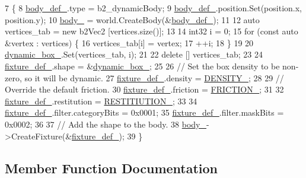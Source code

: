 \begin{DoxyCode}
7                                                                                           \{
8     \hyperlink{classCarBody_a304e0ab7625f9673e4f25c7c52cfd3f8}{body\_def\_}.type = b2\_dynamicBody;
9     \hyperlink{classCarBody_a304e0ab7625f9673e4f25c7c52cfd3f8}{body\_def\_}.position.Set(position.x, position.y);
10     \hyperlink{classCarBody_aa460930fa1548d1987051dfa6f68c897}{body\_} = world.CreateBody(&\hyperlink{classCarBody_a304e0ab7625f9673e4f25c7c52cfd3f8}{body\_def\_});
11 
12     \textcolor{keyword}{auto} vertices\_tab = \textcolor{keyword}{new} b2Vec2 [vertices.size()];
13 
14     int32 i = 0;
15     \textcolor{keywordflow}{for} (\textcolor{keyword}{const} \textcolor{keyword}{auto} &vertex : vertices) \{
16         vertices\_tab[i] = vertex;
17         ++i;
18     \}
19 
20     \hyperlink{classCarBody_aff94f91206a0bdfa00257e68bfcc5633}{dynamic\_box\_}.Set(vertices\_tab, i);
21 
22     \textcolor{keyword}{delete} [] vertices\_tab;
23 
24     \hyperlink{classCarBody_abd8188a5a14a45854cc80da8a70d1c12}{fixture\_def\_}.shape = &\hyperlink{classCarBody_aff94f91206a0bdfa00257e68bfcc5633}{dynamic\_box\_};
25 
26     \textcolor{comment}{// Set the box density to be non-zero, so it will be dynamic.}
27     \hyperlink{classCarBody_abd8188a5a14a45854cc80da8a70d1c12}{fixture\_def\_}.density = \hyperlink{classCarBody_a451074380bc9169117e9beb8303840fe}{DENSITY\_};
28 
29     \textcolor{comment}{// Override the default friction.}
30     \hyperlink{classCarBody_abd8188a5a14a45854cc80da8a70d1c12}{fixture\_def\_}.friction = \hyperlink{classCarBody_af87fcb5e61d186798ee126508eaf5f3f}{FRICTION\_};
31 
32     \hyperlink{classCarBody_abd8188a5a14a45854cc80da8a70d1c12}{fixture\_def\_}.restitution = \hyperlink{classCarBody_a726ff99793ed9dfc0f96e3690c3035f8}{RESTITIUTION\_};
33 
34     \hyperlink{classCarBody_abd8188a5a14a45854cc80da8a70d1c12}{fixture\_def\_}.filter.categoryBits = 0x0001;
35     \hyperlink{classCarBody_abd8188a5a14a45854cc80da8a70d1c12}{fixture\_def\_}.filter.maskBits = 0x0002;
36 
37     \textcolor{comment}{// Add the shape to the body.}
38     \hyperlink{classCarBody_aa460930fa1548d1987051dfa6f68c897}{body\_}->CreateFixture(&\hyperlink{classCarBody_abd8188a5a14a45854cc80da8a70d1c12}{fixture\_def\_});
39 \}
\end{DoxyCode}


\subsection{Member Function Documentation}
\mbox{\label{classCarBody_a92d8865abe51f98b4fa7b4314e7372d8}} 
